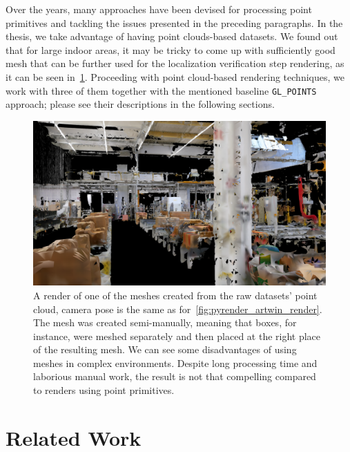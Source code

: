 Over the years, many approaches have been devised for processing point primitives and tackling the
issues presented in the preceding paragraphs. In the thesis, we take advantage of having point clouds-based
datasets. We found out that for large indoor areas, it may be tricky to come up with sufficiently good
mesh that can be further used for the localization verification step rendering, as it can be seen
in~\cref{fig:mesh_artwin_render}. Proceeding with point cloud-based rendering techniques,
we work with three of them together with the mentioned baseline \verb|GL_POINTS| approach;
please see their descriptions in the following sections.

\begin{figure}
    \centering
    \includegraphics[width=.9\textwidth]{../graphics/0217_mesh_artwin_render.png}
    \caption[ARTwin mesh rendered view]{A render of one of the meshes created from the raw datasets' point cloud, camera pose is the same
    as for~\cref{fig:pyrender_artwin_render}. The mesh was created
    semi-manually, meaning that boxes, for instance, were meshed separately and then placed at the right
    place of the resulting mesh. We can see some disadvantages of using meshes in complex environments.
    Despite long processing time and laborious manual work, the result is not that compelling compared to renders
    using point primitives.}\label{fig:mesh_artwin_render}
\end{figure}

\section{Related Work}

